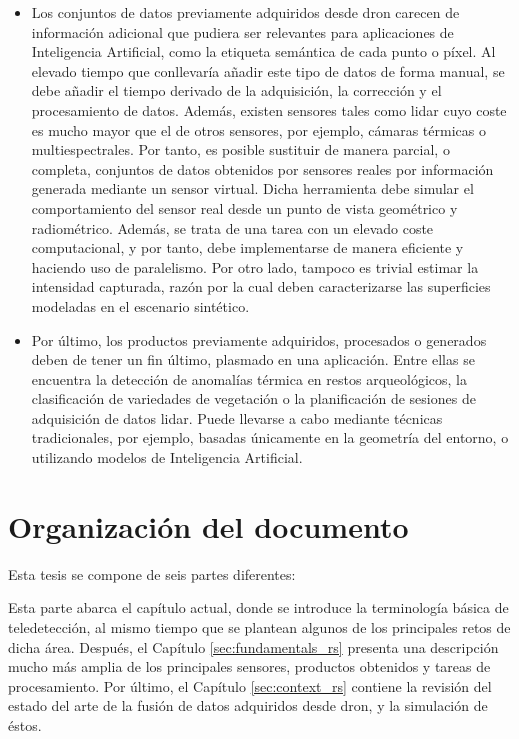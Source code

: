 \begin{itemize}
    \item Los conjuntos de datos previamente adquiridos desde dron carecen de información adicional que pudiera ser relevantes para aplicaciones de Inteligencia Artificial, como la etiqueta semántica de cada punto o píxel. Al elevado tiempo que conllevaría añadir este tipo de datos de forma manual, se debe añadir el tiempo derivado de la adquisición, la corrección y el procesamiento de datos. Además, existen sensores tales como \acrshort{lidar} cuyo coste es mucho mayor que el de otros sensores, por ejemplo, cámaras térmicas o multiespectrales. Por tanto, es posible sustituir de manera parcial, o completa, conjuntos de datos obtenidos por sensores reales por información generada mediante un sensor virtual. Dicha herramienta debe simular el comportamiento del sensor real desde un punto de vista geométrico y radiométrico. Además, se trata de una tarea con un elevado coste computacional, y por tanto, debe implementarse de manera eficiente y haciendo uso de paralelismo. Por otro lado, tampoco es trivial estimar la intensidad capturada, razón por la cual deben caracterizarse las superficies modeladas en el escenario sintético.
    \item Por último, los productos previamente adquiridos, procesados o generados deben de tener un fin último, plasmado en una aplicación. Entre ellas se encuentra la detección de anomalías térmica en restos arqueológicos, la clasificación de variedades de vegetación o la planificación de sesiones de adquisición de datos \acrshort{lidar}. Puede llevarse a cabo mediante técnicas tradicionales, por ejemplo, basadas únicamente en la geometría del entorno, o utilizando modelos de Inteligencia Artificial.
\end{itemize}

\section{Organización del documento}

\newcommand{\partSpacing}{1mm}

Esta tesis se compone de seis partes diferentes:

\small \textbf{} \normalsize\hspace{\partSpacing} Esta parte abarca el capítulo actual, donde se introduce la terminología básica de teledetección, al mismo tiempo que se plantean algunos de los principales retos de dicha área. Después, el Capítulo \ref{sec:fundamentals_rs} presenta una descripción mucho más amplia de los principales sensores, productos obtenidos y tareas de procesamiento. Por último, el Capítulo \ref{sec:context_rs} contiene la revisión del estado del arte de la fusión de datos adquiridos desde dron, y la simulación de éstos.

